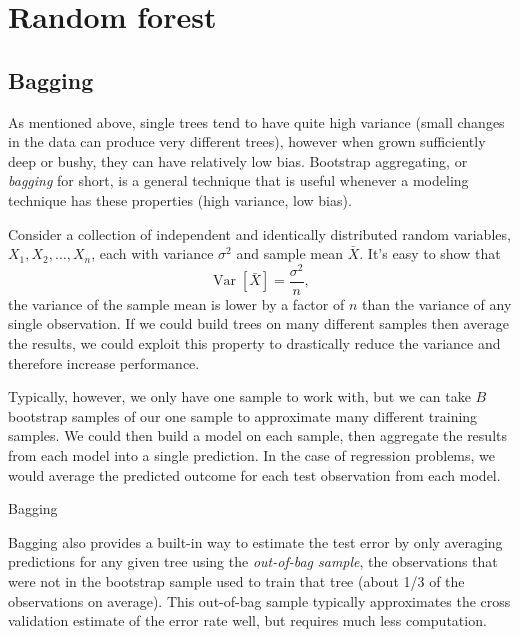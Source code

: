\documentclass[12pt]{article}
\begin{document}


\section{Random forest} %
\label{sec:random_forest}

\subsection{Bagging} %
\label{sub:bagging}

As mentioned above, single trees tend to have quite high variance (small changes in the data can produce very different trees), however when grown sufficiently deep or bushy, they can have relatively low bias. Bootstrap aggregating, or \emph{bagging} for short, is a general technique that is useful whenever a modeling technique has these properties (high variance, low bias).

Consider a collection of independent and identically distributed random variables, $X_{1}, X_{2}, \ldots, X_{n}$, each with variance $\sigma^2$ and sample mean $\bar{X}$. It's easy to show that
\begin{equation}
  \operatorname{Var}[\bar{X}] = \frac{\sigma^2}{n},
\end{equation}
the variance of the sample mean is lower by a factor of $n$ than the variance of any single observation. If we could build trees on many different samples then average the results, we could exploit this property to drastically reduce the variance and therefore increase performance.

Typically, however, we only have one sample to work with, but we can take $B$ bootstrap samples of our one sample to approximate many different training samples. We could then build a model on each sample, then aggregate the results from each model into a single prediction. In the case of regression problems, we would average the predicted outcome for each test observation from each model.

\begin{algorithm}[ht]
 \caption{Bagging}
\end{algorithm}

Bagging also provides a built-in way to estimate the test error by only averaging predictions for any given tree using the \emph{out-of-bag sample}, the observations that were not in the bootstrap sample used to train that tree (about 1/3 of the observations on average). This out-of-bag sample typically approximates the cross validation estimate of the error rate well, but requires much less computation.
\end{document}
